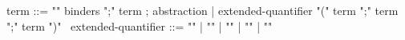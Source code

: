 \begin{syntax}
term ::= "\lambda" binders ";" term ; abstraction
| extended-quantifier "(" term ";" term ";" term ")"
\
extended-quantifier ::= "\max" | "\min" | "\sum" | "\product" | "\numof"
\end{syntax}